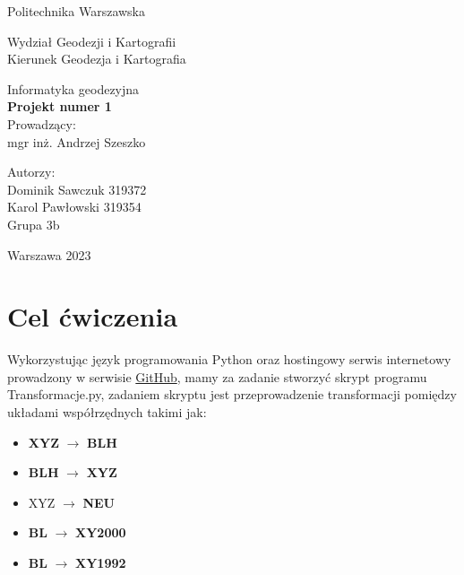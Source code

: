 \documentclass[a4paper,titleauthor]{mwart}
\begin{document}
\thispagestyle{empty}
\begin{center}{\sc \Large
Politechnika Warszawska\\
}\par\vspace{0.2cm}\par 
{\large
Wydział Geodezji i Kartografii\\
Kierunek Geodezja i Kartografia

}\end{center}
\vspace{5cm}
\begin{center}

{\LARGE
 Informatyka geodezyjna\\
\textbf{Projekt numer 1}\\

Prowadzący:\\
mgr inż. Andrzej Szeszko\\

}
\end{center}
\vspace{4cm}
\begin{flushright}

{\large
Autorzy:\\
Dominik Sawczuk 319372\\
Karol Pawłowski 319354 \\
Grupa 3b\\
}
\end{flushright}
\vfill
\begin{center}
Warszawa 2023
\end{center}

\newpage

\tableofcontents
\newpage
\section{Cel ćwiczenia} 
Wykorzystując język programowania Python oraz hostingowy serwis internetowy prowadzony w serwisie \href{https://github.com/Grabarzd/Projekt1}{GitHub}, mamy za zadanie stworzyć skrypt programu Transformacje.py, zadaniem skryptu jest przeprowadzenie transformacji pomiędzy układami współrzędnych takimi jak:
\begin{itemize}
    \item \textbf{XYZ} $\rightarrow$ \textbf{BLH}
    \item \textbf{BLH} $\rightarrow$ \textbf{XYZ}
    \item XYZ $\rightarrow$ \textbf{NEU}
    \item \textbf{BL} $\rightarrow$ \textbf{XY2000}
    \item \textbf{BL} $\rightarrow$ \textbf{XY1992}
\end{itemize}
\end{document}
